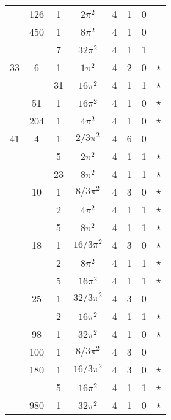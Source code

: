 \documentclass[12pt]{amsart}
\providecommand{\DIFadd}[1]{{\protect\color{blue}\uwave{#1}}} %
\providecommand{\DIFdel}[1]{{\protect\color{red}\sout{#1}}}                      %
\providecommand{\DIFaddbegin}{} %
\providecommand{\DIFaddend}{} %
\providecommand{\DIFdelbegin}{} %
\providecommand{\DIFdelend}{} %
\begin{document}
\begin{tabular}{ccc|ccccc}
 & 126 & 1 & $2\pi^2$ & 4 & 1 & 0 &  \\
 & 450 & 1 & $8\pi^2$ & 4 & 1 & 0 &  \\
 &  & 7 & $32\pi^2$ & 4 & 1 & 1 &  \\
33 & 6 & 1 & \DIFdelbegin \DIFdel{$1\pi^2$ }\DIFdelend \DIFaddbegin \DIFadd{$\pi^2$ }\DIFaddend & 4 & 2 & 0 & $\star$ \\
 &  & 31 & $16\pi^2$ & 4 & 1 & 1 & $\star$ \\
 & 51 & 1 & $16\pi^2$ & 4 & 1 & 0 & $\star$ \\
 & 204 & 1 & $4\pi^2$ & 4 & 1 & 0 & $\star$ \\
41 & 4 & 1 & \DIFdelbegin \DIFdel{$2/3\pi^2$ }\DIFdelend \DIFaddbegin \DIFadd{$(2/3)\pi^2$ }\DIFaddend & 4 & 6 & 0 &  \\
 &  & 5 & $2\pi^2$ & 4 & 1 & 1 & $\star$ \\
 &  & 23 & $8\pi^2$ & 4 & 1 & 1 & $\star$ \\
 & 10 & 1 & \DIFdelbegin \DIFdel{$8/3\pi^2$ }\DIFdelend \DIFaddbegin \DIFadd{$(8/3)\pi^2$ }\DIFaddend & 4 & 3 & 0 & $\star$ \\
 &  & 2 & $4\pi^2$ & 4 & 1 & 1 & $\star$ \\
 &  & 5 & $8\pi^2$ & 4 & 1 & 1 & $\star$ \\
 & 18 & 1 & \DIFdelbegin \DIFdel{$16/3\pi^2$ }\DIFdelend \DIFaddbegin \DIFadd{$(16/3)\pi^2$ }\DIFaddend & 4 & 3 & 0 & $\star$ \\
 &  & 2 & $8\pi^2$ & 4 & 1 & 1 & $\star$ \\
 &  & 5 & $16\pi^2$ & 4 & 1 & 1 & $\star$ \\
 & 25 & 1 & \DIFdelbegin \DIFdel{$32/3\pi^2$ }\DIFdelend \DIFaddbegin \DIFadd{$(32/3)\pi^2$ }\DIFaddend & 4 & 3 & 0 &  \\
 &  & 2 & $16\pi^2$ & 4 & 1 & 1 & $\star$ \\
 & 98 & 1 & $32\pi^2$ & 4 & 1 & 0 & $\star$ \\
 & 100 & 1 & \DIFdelbegin \DIFdel{$8/3\pi^2$ }\DIFdelend \DIFaddbegin \DIFadd{$(8/3)\pi^2$ }\DIFaddend & 4 & 3 & 0 &  \\
 & 180 & 1 & \DIFdelbegin \DIFdel{$16/3\pi^2$ }\DIFdelend \DIFaddbegin \DIFadd{$(16/3)\pi^2$ }\DIFaddend & 4 & 3 & 0 & $\star$ \\
 &  & 5 & $16\pi^2$ & 4 & 1 & 1 & $\star$ \\
 & 980 & 1 & $32\pi^2$ & 4 & 1 & 0 & $\star$ 
\end{tabular}
\end{document}
